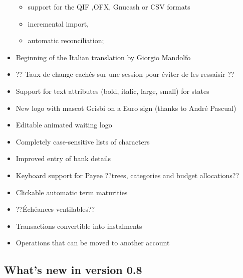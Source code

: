 \begin{itemize}
\begin{itemize}

\item support for the \gls{QIF} ,\gls{OFX}, \gls{Gnucash} or \gls{CSV}  formats

\item incremental import,

\item automatic reconciliation;

\end{itemize}

\item Beginning of the Italian translation by Giorgio Mandolfo

\item ?? Taux de change cachés sur une session pour éviter de les ressaisir ??

\item Support for text attributes (bold, italic, large, small) for states

\item New logo with mascot Grisbi on a Euro sign (thanks to André Pascual)

\item Editable animated waiting logo

\item Completely case-sensitive lists of characters

\item Improved entry of bank details

\item Keyboard support for Payee ??trees, categories and budget allocations??

\item Clickable automatic term maturities

\item ??Échéances ventilables??

\item Transactions convertible into instalments

\item Operations that can be moved to another account

\end{itemize}

\subsection{What's new in version 0.8}

